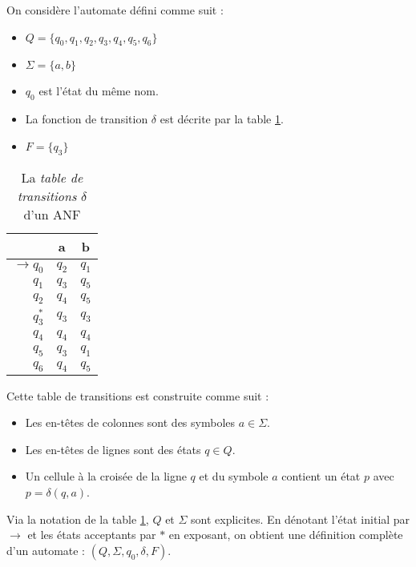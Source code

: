 \begin{example}\label{ex:adf}
  On considère l'automate \automaton défini comme suit :
  \begin{itemize}
    \item $Q=\{q_0,q_1,q_2,q_3,q_4,q_5,q_6\}$
    \item $\Sigma=\{a,b\}$
    \item $q_0$ est l'état du même nom.
    \item La fonction de transition $\delta$ est décrite par la table \ref{table:transdelta}.
    \item $F=\{q_3\}$
  \end{itemize}

  \begin{table}[H]
    \centering
    \begin{tabular}{|r||c|c|}
      \hline
      &a&b\\
      \hline\hline
      $\rightarrow q_0$&$q_2$&$q_1$\\\hline
      $q_1$&$q_3$&$q_5$\\\hline
      $q_2$&$q_4$&$q_5$\\\hline
      $q_3^*$&$q_3$&$q_3$\\\hline
      $q_4$&$q_4$&$q_4$\\\hline
      $q_5$&$q_3$&$q_1$\\\hline
      $q_6$&$q_4$&$q_5$\\\hline
    \end{tabular}
    \caption{La \emph{table de transitions} $\delta$ d'un ANF}
    \label{table:transdelta}
  \end{table}
\end{example}

Cette table de transitions est construite comme suit :
\begin{itemize}
  \item Les en-têtes de colonnes sont des symboles $a\in\Sigma$.
  \item Les en-têtes de lignes sont des états $q \in Q$.
  \item Un cellule à la croisée de la ligne $q$ et du symbole $a$ contient un état $p$ avec $p=\delta(q,a)$.
\end{itemize}

Via la notation de la table \ref{table:transdelta}, $Q$ et $\Sigma$ sont explicites. En dénotant l'état initial par $\rightarrow$ et les états acceptants par $*$ en exposant, on obtient une définition complète d'un automate : $(Q,\Sigma, q_0, \delta, F)$.

